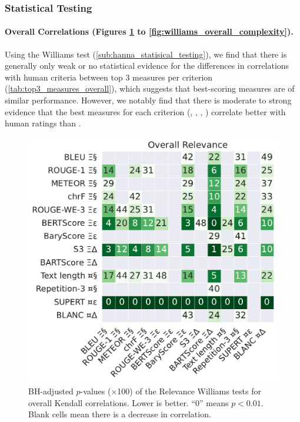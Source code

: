 \subsubsection{Statistical Testing}

\paragraph{Overall Correlations (Figures \ref{fig:williams_overall_relevance} to \ref{fig:williams_overall_complexity}).}
Using the Williams test (\autoref{sub:hanna_statisical_testing}), we find that there is generally only weak or no statistical evidence for the differences in correlations with human criteria between top 3 measures per criterion (\autoref{tab:top3_measures_overall}), which suggests that best-scoring measures are of similar performance. However, we notably find that there is moderate to strong evidence that the best measures for each criterion (\supert, \repetition, \bertscore, \tlength) correlate better with human ratings than {\bleu}.

\begin{figure}[h]
    \centering
    \includegraphics[width=0.62\columnwidth]{pictures/williams_overall_kendall_Relevance.pdf}
    \caption{BH-adjusted $p$-values ($\times$100) of the Relevance Williams tests for overall Kendall correlations. Lower is better. ``0'' means $p<0.01$. Blank cells mean there is a decrease in correlation.}
    \label{fig:williams_overall_relevance}
\end{figure}

